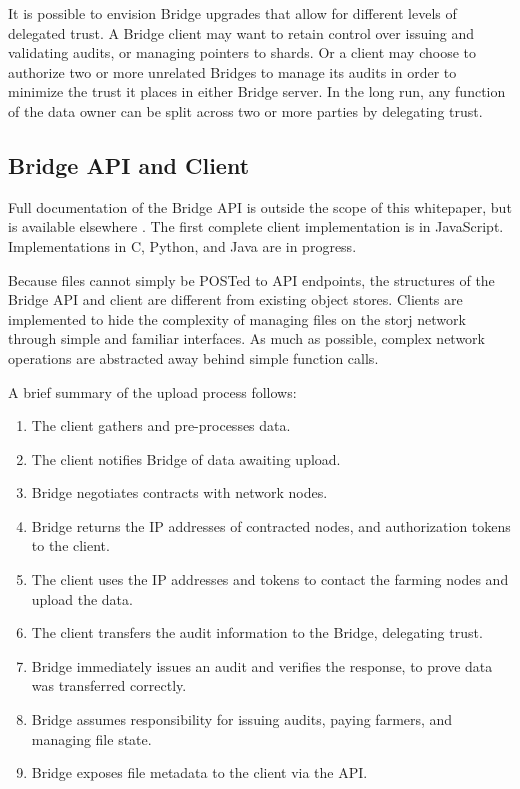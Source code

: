 \documentclass[a4paper,10pt]{article}
\begin{document}
It is possible to envision Bridge upgrades that allow for different levels of
delegated trust. A Bridge client may want to retain control over issuing and
validating audits, or managing pointers to shards. Or a client may choose to
authorize two or more unrelated Bridges to manage its audits in order to
minimize the trust it places in either Bridge server. In the long run, any
function of the data owner can be split across two or more parties by delegating
trust.

\subsection{Bridge API and Client}
Full documentation of the Bridge API is outside the scope of this whitepaper,
but is available elsewhere \cite{16}. The first complete client implementation
is in JavaScript. Implementations in C, Python, and Java are in progress.

Because files cannot simply be POSTed to API endpoints, the structures of the
Bridge API and client are different from existing object stores. Clients are
implemented to hide the complexity of managing files on the storj network
through simple and familiar interfaces. As much as possible, complex network
operations are abstracted away behind simple function calls.

A brief summary of the upload process follows:

\begin{enumerate}
\item The client gathers and pre-processes data.
\item The client notifies Bridge of data awaiting upload.
\item Bridge negotiates contracts with network nodes.
\item Bridge returns the IP addresses of contracted nodes, and authorization
tokens to the client.
\item The client uses the IP addresses and tokens to contact the farming nodes
and upload the data.
\item The client transfers the audit information to the Bridge, delegating
trust.
\item Bridge immediately issues an audit and verifies the response, to prove
data was transferred correctly.
\item Bridge assumes responsibility for issuing audits, paying farmers, and
managing file state.
\item Bridge exposes file metadata to the client via the API.
\end{enumerate}
\end{document}
